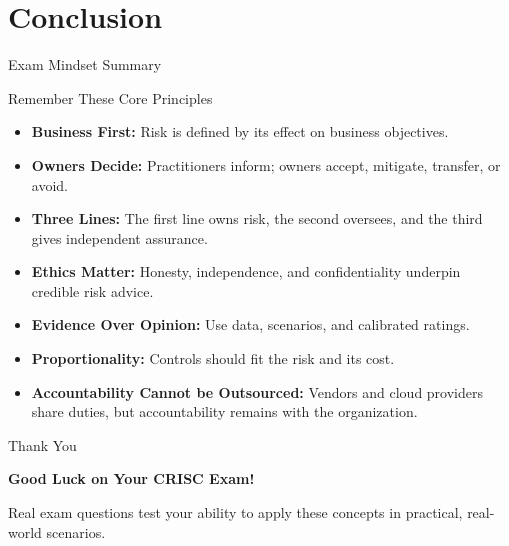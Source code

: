 \documentclass[aspectratio=169]{beamer}
\begin{document}
	\section{Conclusion}

	\begin{frame}{Exam Mindset Summary}
		\begin{block}{Remember These Core Principles}
			\begin{itemize}
				\item \textbf{Business First:} Risk is defined by its effect on business objectives.
				\item \textbf{Owners Decide:} Practitioners inform; owners accept, mitigate, transfer, or avoid.
				\item \textbf{Three Lines:} The first line owns risk, the second oversees, and the third gives independent assurance.
				\item \textbf{Ethics Matter:} Honesty, independence, and confidentiality underpin credible risk advice.
				\item \textbf{Evidence Over Opinion:} Use data, scenarios, and calibrated ratings.
				\item \textbf{Proportionality:} Controls should fit the risk and its cost.
				\item \textbf{Accountability Cannot be Outsourced:} Vendors and cloud providers share duties, but accountability remains with the organization.
			\end{itemize}
		\end{block}
	\end{frame}

	\begin{frame}{Thank You}
		\begin{center}
			{\Huge \textbf{Good Luck on Your CRISC Exam!}}

			\vspace{1cm}

			\normalsize
			Real exam questions test your ability to apply these concepts in practical, real-world scenarios.
		\end{center}
	\end{frame}
\end{document}
